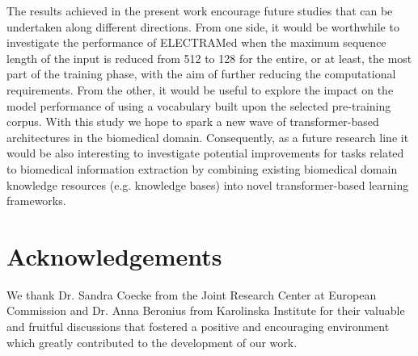 \documentclass{article}
\begin{document}
The results achieved in the present work encourage future studies that can be undertaken along different directions.
From one side, it would be worthwhile to investigate the performance of ELECTRAMed when the maximum sequence length of the input is reduced from 512 to 128 for the entire, or at least, the most part of the training phase, with the aim of further reducing the computational requirements.
From the other, it would be useful to explore the impact on the model performance of using a vocabulary built upon the selected pre-training corpus.
With this study we hope to spark a new wave of transformer-based architectures in the biomedical domain.
Consequently, as a future research line it would be also interesting to investigate potential improvements for tasks related to biomedical information extraction by combining existing biomedical domain knowledge resources (e.g. knowledge bases) into novel transformer-based learning frameworks.

\section*{Acknowledgements}

We thank Dr. Sandra Coecke from the Joint Research Center at European Commission and Dr. Anna Beronius from Karolinska Institute for their valuable and fruitful discussions that fostered a positive and encouraging environment which greatly contributed to the development of our work.


  
  
\end{document}
